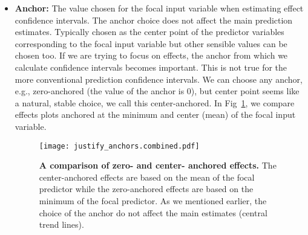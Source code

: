 \begin{itemize}
\item \textbf{Anchor:} The value chosen for the focal input variable when estimating effect confidence intervals. The anchor choice does not affect the main prediction estimates. Typically chosen as the center point of the predictor variables corresponding to the focal input variable but other sensible values can be chosen too. If we are trying to focus on effects, the anchor from which we calculate confidence intervals becomes important. This is not true for the more conventional prediction confidence intervals. We can choose any anchor, e.g., zero-anchored (the value of the anchor is $0$), but center point seems like a natural, stable choice, we call this center-anchored. In Fig~\ref{fig:justify_anchors}, we compare effects plots anchored at the minimum and center (mean) of the focal input variable.
%
\begin{figure}
\begin{center}
\texttt{[image: justify\_anchors.combined.pdf]}
\end{center}
\caption{{\bf A comparison of zero- and center- anchored effects.} The center-anchored effects are based on the mean of the focal predictor while the zero-anchored effects are based on the minimum of the focal predictor. As we mentioned earlier, the choice of the anchor do not affect the main estimates (central trend lines).} 
\label{fig:justify_anchors}
\end{figure}
%

\end{itemize}
